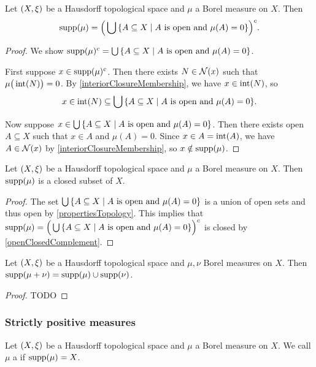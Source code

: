 \begin{proposition}
Let $\sSet{X, \xi}$ be a Hausdorff topological space and $\mu$ a Borel measure on $X$. Then
\[ \supp(\mu) = \Big(\bigcup \setbuilder{A\subseteq X}{\text{$A$ is open and $\mu(A) = 0$}} \Big)^c. \]
\end{proposition}
\begin{proof}
We show $\supp(\mu)^c = \bigcup \setbuilder{A\subseteq X}{\text{$A$ is open and $\mu(A) = 0$}}$.

First suppose $x\in \operatorname{supp}(\mu)^c$. Then there exists $N\in \operatorname{\mathcal{N}}(x)$ such that $\mu\big(\operatorname{int}(N)\big) = 0$. By \ref{interiorClosureMembership}, we have $x\in \operatorname{int}(N)$, so
\[ x\in \interior(N) \subseteq \bigcup \setbuilder{A\subseteq X}{\text{$A$ is open and $\mu(A) = 0$}}. \]

Now suppose $x\in \bigcup \setbuilder{A\subseteq X}{\text{$A$ is open and $\mu(A) = 0$}}$. Then there exists open $A\subseteq X$ such that $x\in A$ and $\mu(A) = 0$. Since $x\in A = \operatorname{int}(A)$, we have $A\in \operatorname{\mathcal{N}}(x)$ by \ref{interiorClosureMembership}, so $x\notin \operatorname{supp}(\mu)$.
\end{proof}
\begin{corollary}
Let $\sSet{X, \xi}$ be a Hausdorff topological space and $\mu$ a Borel measure on $X$. Then $\operatorname{supp}(\mu)$ is a closed subset of $X$.
\end{corollary}
\begin{proof}
The set $\bigcup \setbuilder{A\subseteq X}{\text{$A$ is open and $\mu(A) = 0$}}$ is a union of open sets and thus open by \ref{propertiesTopology}. This implies that $\supp(\mu) = \Big(\bigcup \setbuilder{A\subseteq X}{\text{$A$ is open and $\mu(A) = 0$}}\Big)^c$ is closed by \ref{openClosedComplement}.
\end{proof}

\begin{proposition}
Let $\sSet{X, \xi}$ be a Hausdorff topological space and $\mu, \nu$ Borel measures on $X$. Then $\operatorname{supp}(\mu + \nu) = \operatorname{supp}(\mu) \cup \operatorname{supp}(\nu)$.
\end{proposition}
\begin{proof}
TODO
\end{proof}

\subsubsection{Strictly positive measures}
\begin{definition}
Let $\sSet{X, \xi}$ be a Hausdorff topological space and $\mu$ a Borel measure on $X$. We call $\mu$ a  if $\operatorname{supp}(\mu) = X$.
\end{definition}


